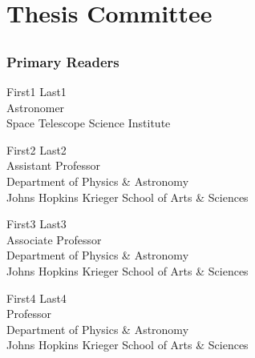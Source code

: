 \chapter*{Thesis Committee}

\section*{}
\subsection*{Primary Readers}

\begin{singlespace}


\indent First1 Last1\\
\indent \indent  Astronomer\\
\indent \indent  Space Telescope Science Institute \\


\smallskip 

\noindent First2 Last2\\
\indent \indent Assistant Professor\\
\indent \indent Department of Physics \& Astronomy\\
\indent \indent  Johns Hopkins Krieger School of Arts \& Sciences \\

\smallskip 

\noindent First3 Last3 \\
\indent \indent Associate Professor\\
\indent \indent Department of Physics \& Astronomy \\
\indent \indent  Johns Hopkins Krieger School of Arts \& Sciences \\

\smallskip


\noindent First4 Last4 \\
\indent \indent Professor\\
\indent \indent Department of Physics \& Astronomy \\
\indent \indent  Johns Hopkins Krieger School of Arts \& Sciences \\

\end{singlespace}

